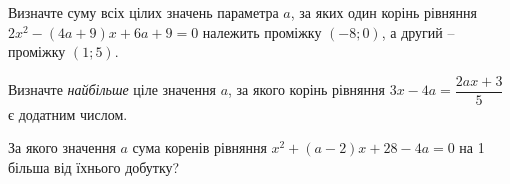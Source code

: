 \documentclass[12pt]{article}
\begin{document}
\begingroup\setcounter{zad}{0}
\providecommand{\trigStyle}[1]{#1}
\providecommand{\answerTableSmall}[5]{%
\begingroup\setlength{\tabcolsep}{2pt}\small\nmtSetCell
\begin{tabular}{|*{5}{>{\centering\arraybackslash}m{\nmtcellw}|}}
\hline
\rule[-0.2cm]{0pt}{0.6cm}\textbf{А} & \textbf{Б} & \textbf{В} & \textbf{Г} & \textbf{Д} \\
\hline
\rule[-0.4cm]{0pt}{0.9cm}#1 & \rule[-0.4cm]{0pt}{0.9cm}#2 & \rule[-0.4cm]{0pt}{0.9cm}#3 & \rule[-0.4cm]{0pt}{0.9cm}#4 & \rule[-0.4cm]{0pt}{0.9cm}#5 \\
\hline
\end{tabular}\endgroup}
\providecommand{\answerListVertical}[5]{\nmtOptions{#1}{#2}{#3}{#4}{#5}}

\par\vspace{0.2cm}


\begin{samepage}
\noindent\zadnum Визначте суму всіх цілих значень параметра $a$, за яких один корінь рівняння $2x^2 - (4a + 9)x + 6a + 9 = 0$ належить проміжку $(-8; 0)$, а другий – проміжку $(1; 5)$. 

\nmtnobreak
\nopagebreak\nbvspace{0.3cm}
\nmtAnswerBox
\par{}
\end{samepage}

\begin{samepage}
\noindent\zadnum Визначте \textit{найбільше} ціле значення $a$, за якого корінь рівняння $3x - 4a = \dfrac{2ax + 3}{5}$ є додатним числом. 

\nmtnobreak
\nopagebreak\nbvspace{0.3cm}
\nmtAnswerBox
\par{}
\end{samepage}

\begin{samepage}
\noindent\zadnum За якого значення $a$ сума коренів рівняння $x^2 + (a - 2)x + 28 - 4a = 0$ на 1 більша від їхнього добутку? 

\nmtnobreak
\nopagebreak\nbvspace{0.3cm}
\nmtAnswerBox
\par{}
\end{samepage}
\end{document}
